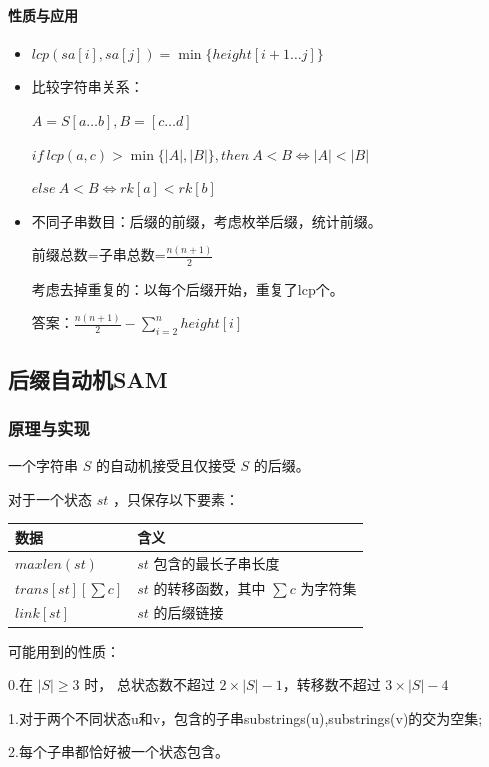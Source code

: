 \documentclass[a4paper,11pt]{article}
\begin{document}
\paragraph{性质与应用}

\begin{itemize}
\item
  \(lcp(sa[i],sa[j])=\min\lbrace{height[i+1\dots j]}\rbrace\)

\item
  比较字符串关系：

  \(A=S[a\dots b],B=[c\dots d]\)

  \(if\ lcp(a,c)>\min\lbrace{|A|,|B|}\rbrace,then\ A<B\iff |A|<|B|\)

  \(else\ A<B\iff rk[a]<rk[b]\)

\item
  不同子串数目：后缀的前缀，考虑枚举后缀，统计前缀。

  前缀总数=子串总数=\(\frac{n(n+1)}{2}\)

  考虑去掉重复的：以每个后缀开始，重复了lcp个。

  答案：\(\frac{n(n+1)}{2}-\sum\limits_{i=2}^{n}height[i]\)
\end{itemize}

\subsection{后缀自动机SAM}
\subsubsection{原理与实现}

一个字符串 \(S\) 的自动机接受且仅接受 \(S\) 的后缀。

对于一个状态 \(st\) ，只保存以下要素：

\begin{longtable}[]{@{}ll@{}}
\toprule
数据 & 含义\tabularnewline
\midrule
\endhead
\(maxlen(st)\) & \(st\) 包含的最长子串长度\tabularnewline
\(trans[st][\sum c]\) & \(st\) 的转移函数，其中 \(\sum c\)
为字符集\tabularnewline
\(link[st]\) & \(st\) 的后缀链接\tabularnewline
\bottomrule
\end{longtable}

可能用到的性质：

0.在 \(|S|\ge 3\) 时， 总状态数不超过 \(2\times |S|-1\)，转移数不超过
\(3\times|S|-4\) 

1.对于两个不同状态u和v，包含的子串substrings(u),substrings(v)的交为空集; 

2.每个子串都恰好被一个状态包含。
\end{document}
